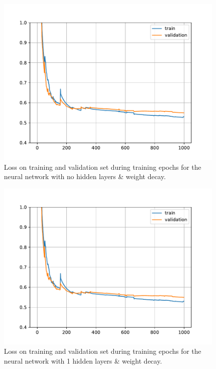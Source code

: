 \begin{figure}[h!]
    \centering
    \includegraphics{pics/figure_Credit_NN_1hidden_wd_loss.pdf}
    \caption{Loss on training and validation set during training epochs for the neural network with no hidden layers \& weight decay.}
    \label{fig:Credit_NN_nohidden_wd_loss}
\end{figure}

\begin{figure}
    \centering
    \includegraphics{pics/figure_Credit_NN_1hidden_wd_loss.pdf}
    \caption{Loss on training and validation set during training epochs for the neural network with 1 hidden layers \& weight decay. }
    \label{fig:Credit_NN_1hidden_wd_loss}
\end{figure}


